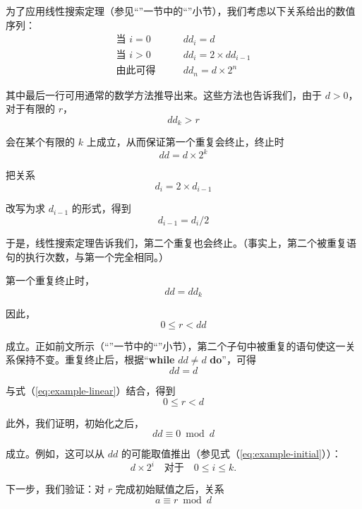 \documentclass[twoside,11pt,fontset=none]{ctexbook}
\begin{document}
为了应用线性搜索定理（参见“”一节中的“”小节），我们考虑以下关系给出的数值序列：
\begin{equation}
	\label{eq:example-initial}
	\begin{split}
		\text{当 } i = 0\qquad & dd_i = d \\
		\text{当 } i > 0\qquad & dd_i = 2\times dd_{i - 1}\\
		\text{由此可得}\qquad & dd_n = d\times 2^n
	\end{split}
\end{equation}


\noindent
其中最后一行可用通常的数学方法推导出来。这些方法也告诉我们，由于 $d > 0$，对于有限的 $r$，
$$
dd_k > r
$$

\noindent
会在某个有限的 $k$ 上成立，从而保证第一个重复会终止，终止时
$$
dd = d\times 2^k
$$

把关系
$$
d_i = 2\times d_{i-1}
$$

\noindent
改写为求 $d_{i-1}$ 的形式，得到
$$
d_{i-1} = d_i/2
$$

\noindent
于是，线性搜索定理告诉我们，第二个重复也会终止。（事实上，第二个被重复语句的执行次数，与第一个完全相同。）

第一个重复终止时，
$$
dd=dd_k
$$

\noindent
因此，
\begin{equation}
	\label{eq:example-linear}
	0 \leqslant r <dd
\end{equation}

\noindent
成立。正如前文所示（“”一节中的“”小节），第二个子句中被重复的语句使这一关系保持不变。重复终止后，根据“\textbf{while} $dd \neq d$ \textbf{do}”，可得
$$
dd = d
$$

\noindent
与式（\ref{eq:example-linear}）结合，得到
\begin{equation}
	\label{eq:example-r-interval}
	0 \leqslant r < d
\end{equation}

此外，我们证明，初始化之后，
\begin{equation}
	\label{eq:example-dd-equiv-0-mod-d}
	dd \equiv 0 \bmod d
\end{equation}

\noindent
成立。例如，这可以从 $dd$ 的可能取值推出（参见式（\ref{eq:example-initial}））：
$$
d\times 2^i\quad \text{对于}\quad 0 \leqslant i \leqslant k.
$$

下一步，我们验证：对 $r$ 完成初始赋值之后，关系
\begin{equation}
	\label{eq:example-a-equiv-r-mod-d}
	a \equiv r \bmod d
\end{equation}
\end{document}
